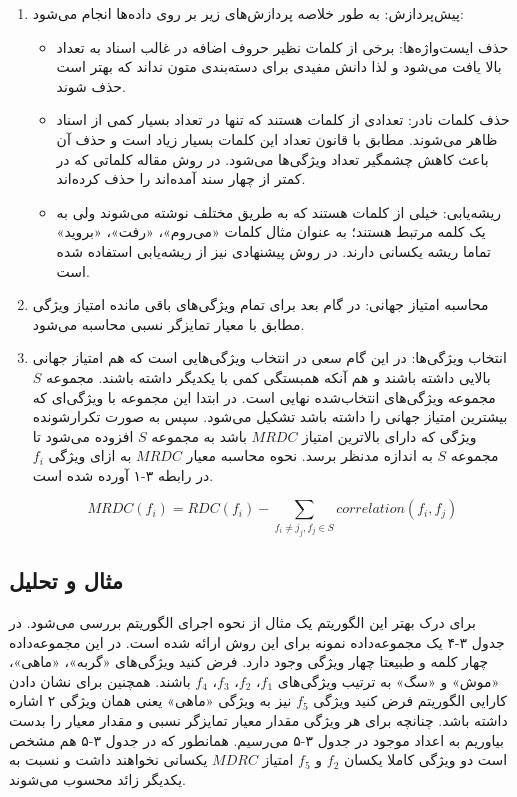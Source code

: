 \begin{enumerate}
\item پیش‌پردازش: به طور خلاصه پردازش‌های زیر بر روی داده‌ها انجام می‌شود:

\begin{itemize}

\item حذف ایست‌واژه‌‌ها: برخی از کلمات نظیر حروف اضافه در غالب اسناد به تعداد بالا یافت می‌شود و لذا دانش مفیدی برای دسته‌بندی متون نداند که بهتر است حذف شوند.
\item حذف کلمات نادر: تعدادی از کلمات هستند که تنها در تعداد بسیار کمی از اسناد ظاهر می‌شوند. مطابق با قانون  تعداد این کلمات بسیار زیاد است و حذف آن باعث کاهش چشمگیر تعداد ویژگی‌ها می‌شود. در روش مقاله کلماتی که در کمتر از چهار سند آمده‌اند را حذف کرده‌اند.
\item ریشه‌یابی: خیلی از کلمات هستند که به طریق مختلف نوشته می‌شوند ولی به یک کلمه مرتبط هستند؛ به عنوان مثال کلمات «می‌روم»، «رفت»، «بروید» تماما ریشه یکسانی دارند. در روش پیشنهادی نیز از ریشه‌یابی استفاده شده است.
\end{itemize}

\item محاسبه امتیاز جهانی: در گام بعد برای تمام ویژگی‌های باقی مانده امتیاز ویژگی مطابق با معیار تمایزگر نسبی محاسبه می‌شود.

\item انتخاب ویژگی‌‌ها: در این گام سعی در انتخاب ویژگی‌هایی است که هم امتیاز جهانی بالایی داشته باشند و هم آنکه همبستگی کمی با یکدیگر داشته باشند. مجموعه 
$S$
مجموعه ویژگی‌های انتخاب‌شده نهایی است. در ابتدا این مجموعه با ویژگی‌ای که بیشترین امتیاز جهانی را داشته باشد تشکیل می‌شود. سپس به صورت تکرارشونده ویژگی که دارای بالاترین امتیاز 
$MRDC$
باشد به مجموعه
$S$
افزوده می‌شود تا مجموعه
$S$
به اندازه مدنظر برسد. نحوه محاسبه معیار
$MRDC$
به ازای ویژگی 
$f_i$
در رابطه ۳-۱ آورده شده است.

\begin{equation}
MRDC(f_i) = RDC(f_i) - \sum_{f_i \ne j_j, f_j \in S} correlation(f_i, f_j)
\end{equation}
 
\end{enumerate}

\subsection{مثال و تحلیل}
برای درک بهتر این الگوریتم یک مثال از نحوه اجرای الگوریتم بررسی می‌شود.\cite{labani2018novel} در جدول ۳-۴ یک مجموعه‌داده نمونه برای این روش ارائه شده است. در این مجموعه‌داده چهار کلمه و طبیعتا چهار ویژگی وجود دارد. فرض کنید ویژگی‌های «گربه»، «ماهی»، «موش» و «سگ» به ترتیب ویژگی‌های
$f_1$، $f_2$، $f_3$، $f_4$
باشند. همچنین برای نشان دادن کارایی الگوریتم فرض کنید ویژگی
$f_5$
نیز به ویژگی «ماهی» یعنی همان ویژگی ۲ اشاره داشته باشد. چنانچه برای هر ویژگی مقدار معیار تمایزگر نسبی و مقدار معیار  را بدست بیاوریم به اعداد موجود در جدول ۳-۵ می‌رسیم. همانطور که در جدول ۳-۵ هم مشخص است دو ویژگی کاملا یکسان $f_2$ و $f_5$ امتیاز $MDRC$ یکسانی نخواهند داشت و نسبت به یکدیگر زائد محسوب می‌شوند.

